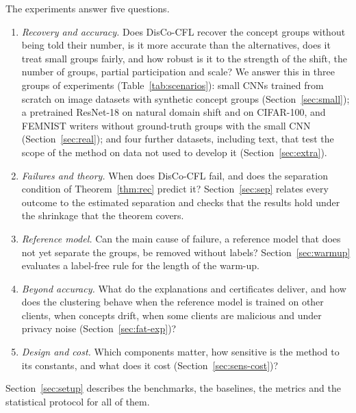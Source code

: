 The experiments answer five questions.
\begin{enumerate}[label=(Q\arabic*),leftmargin=*,itemsep=1pt]
\item \emph{Recovery and accuracy.} Does DisCo-CFL recover the concept groups without being told their number, is it more accurate than the alternatives, does it treat small groups fairly, and how robust is it to the strength of the shift, the number of groups, partial participation and scale? We answer this in three groups of experiments (Table~\ref{tab:scenarios}): small CNNs trained from scratch on image datasets with synthetic concept groups (Section~\ref{sec:small}); a pretrained ResNet-18 on natural domain shift and on CIFAR-100, and FEMNIST writers without ground-truth groups with the small CNN (Section~\ref{sec:real}); and four further datasets, including text, that test the scope of the method on data not used to develop it (Section~\ref{sec:extra}).
\item \emph{Failures and theory.} When does DisCo-CFL fail, and does the separation condition of Theorem~\ref{thm:rec} predict it? Section~\ref{sec:sep} relates every outcome to the estimated separation and checks that the results hold under the shrinkage that the theorem covers.
\item \emph{Reference model.} Can the main cause of failure, a reference model that does not yet separate the groups, be removed without labels? Section~\ref{sec:warmup} evaluates a label-free rule for the length of the warm-up.
\item \emph{Beyond accuracy.} What do the explanations and certificates deliver, and how does the clustering behave when the reference model is trained on other clients, when concepts drift, when some clients are malicious and under privacy noise (Section~\ref{sec:fat-exp})?
\item \emph{Design and cost.} Which components matter, how sensitive is the method to its constants, and what does it cost (Section~\ref{sec:sens-cost})?
\end{enumerate}
Section~\ref{sec:setup} describes the benchmarks, the baselines, the metrics and the statistical protocol for all of them.








